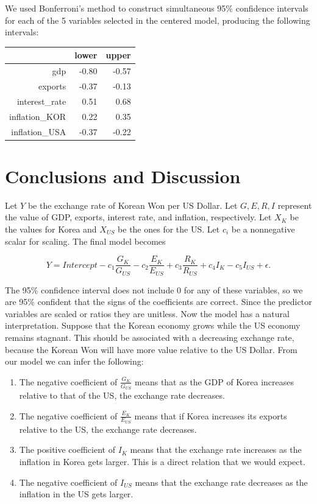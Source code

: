 \documentclass[12pt]{article}
\begin{document}
We used Bonferroni's method to construct simultaneous 95\% confidence intervals
for each of the 5 variables selected in the centered model, producing the
following intervals:

\begin{table}[ht]
\centering
\begin{tabular}{rrr}
  \hline
 & lower & upper \\
  \hline
  gdp & -0.80 & -0.57 \\
  exports & -0.37 & -0.13 \\
  interest\_rate & 0.51 & 0.68 \\
  inflation\_KOR & 0.22 & 0.35 \\
  inflation\_USA & -0.37 & -0.22 \\
   \hline
\end{tabular}
\end{table}

\section{Conclusions and Discussion}

Let $Y$ be the exchange rate of Korean Won per US Dollar. Let $G, E, R, I$
represent the value of GDP, exports, interest rate, and inflation, respectively.
Let $X_K$ be the values for Korea and $X_{US}$ be the ones for the US. Let
$c_i$ be a nonnegative scalar for scaling.
The final model becomes

\[
    Y = Intercept -c_1 \frac{G_{K}}{G_{US}}
    -c_2 \frac{E_{K}}{E_{US}}
    +c_3 \frac{R_{K}}{R_{US}}
    +c_4I_{K} - c_5 I_{US} + \epsilon.
\]

The 95\% confidence interval does not include 0 for any of these variables,
so we are 95\% confident that the signs of the coefficients are correct. Since the predictor variables
are scaled or ratios they are unitless. Now the model has a
natural interpretation. Suppose that the Korean economy grows while the US
economy remains stagnant. This should be associated with a decreasing
exchange rate, because
the Korean Won will have more value relative to the US Dollar.
From our model we can infer the following:

\begin{enumerate}
    \item The negative coefficient of $\frac{G_{K}}{G_{US}}$ means that as
        the GDP of Korea increases relative to that of the US, the exchange
        rate decreases. 
    \item The negative coefficient of $\frac{E_{K}}{E_{US}}$ means that if
        Korea increases its exports relative to the US, the exchange rate
        decreases.
    \item The positive coefficient of $I_K$ means that the exchange rate
        increases as the inflation in Korea gets larger. This is a direct
        relation that we would expect.
    \item The negative coefficient of $I_{US}$ means that the exchange rate
        decreases as the inflation in the US gets larger.
\end{enumerate}
\end{document}
